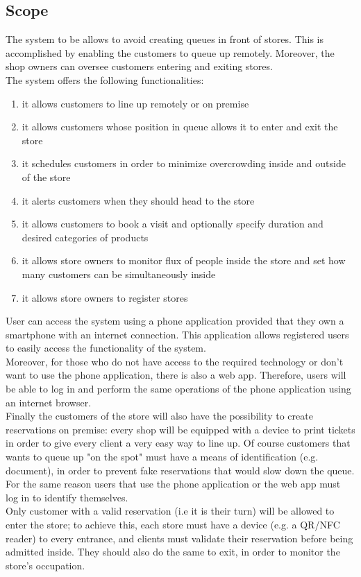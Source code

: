 \subsection{Scope}
The system to be allows to avoid creating queues in front of stores.
This is accomplished by enabling the customers to queue up remotely.
Moreover, the shop owners can oversee customers entering and exiting stores. \\
The system offers the following functionalities:
\begin{enumerate}[label=F\arabic*]
	\item it allows customers to line up remotely or on premise
	\item it allows customers whose position in queue allows it to enter and exit the store
	\item it schedules customers in order to minimize overcrowding inside and outside of the store
	\item it alerts customers when they should head to the store
	\item it allows customers to book a visit and optionally specify duration and desired categories of products
	\item it allows store owners to monitor flux of people inside the store and set how many customers can be simultaneously inside
	\item it allows store owners to register stores
\end{enumerate}
User can access the system using a phone application provided that they own a smartphone with an internet connection. This application allows registered users to easily access the functionality of the system.\\Moreover, for those who do not have access to the required technology or don't want to use the phone application, there is also a web app. Therefore, users will be able to log in and perform the same operations of the phone application using an internet browser.\\ Finally the customers of the store will also have the possibility to create reservations on premise: every shop will be equipped with a device to print tickets in order to give every client a very easy way to line up. Of course customers that wants to queue up "on the spot" must have a means of identification (e.g. document), in order to prevent fake reservations that would slow down the queue. For the same reason users that use the phone application or the web app must log in to identify themselves.\\
Only customer with a valid reservation (i.e it is their turn) will be allowed to enter the store; to achieve this, each store must have a device (e.g. a QR/NFC reader) to every entrance, and clients must validate their reservation before being admitted inside. They should also do the same to exit, in order to monitor the store's occupation.
